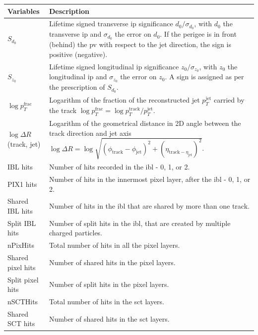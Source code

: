 \begin{table}[h]
  \begin{center}
      \begin{tabular}{C{3cm}|C{13cm}} 
      	 \hline \hline
          Variables & Description  \\ \hline
          $S_{d_0}$      & Lifetime signed transverse \gls{ip} significance $d_0 / \sigma_{d_0}$, with $d_0$ the transverse \gls{ip} and $\sigma_{d_0}$ the error on $d_0$. If the perigee is in front (behind) the \gls{pv} with respect to the jet direction, the sign is positive (negative). \\ \hline
          $S_{z_0}$      & Lifetime signed longitudinal \gls{ip} significance $z_0 / \sigma_{z_0}$, with $z_0$ the longitudinal \gls{ip} and $\sigma_{z_0}$ the error on $z_0$. A sign is assigned as per the prescription of $S_{d_0}$. \\ \hline
          $\log p_T^{\textrm{frac}}$   & Logarithm of the fraction of the reconstructed jet $p_T^{\textrm{jet}}$ carried by the track $\log p_T^{\textrm{frac}} = \log p_T^{\textrm{track}} / p_T^{\textrm{jet}}$. \\ \hline
          $\log \Delta R$(track, jet) & Logarithm of the geometrical distance in 2D angle between the track direction and jet axis $\log \Delta R = \log \sqrt{(\phi_{\textrm{track}} - \phi_{\textrm{jet}})^2 + (\eta_{\textrm{track} - \eta_{\textrm{jet}}})^2}$. \\ \hline
          IBL hits      & Number of hits recorded in the \gls{ibl} - 0, 1, or 2. \\ \hline
          PIX1 hits       & Number of hits in the innermost pixel layer, after the \gls{ibl} - 0, 1, or 2.  \\ \hline
          Shared IBL hits & Number of hits in the \gls{ibl} that are shared by more than one track. \\ \hline
          Split IBL hits  & Number of split hits in the \gls{ibl}, that are created by multiple charged particles. \\ \hline
          nPixHits        & Total number of hits in all the pixel layers.\\ \hline
          Shared pixel hits & Number of shared hits in the pixel layers.\\ \hline
          Split pixel hits  & Number of split hits in the pixel layers.\\ \hline
          nSCTHits          & Total number of hits in the \gls{sct} layers. \\ \hline
          Shared SCT hits   & Number of shared hits in the \gls{sct} layers.\\ \hline \hline

\end{tabular}
\end{center}
\end{table}

